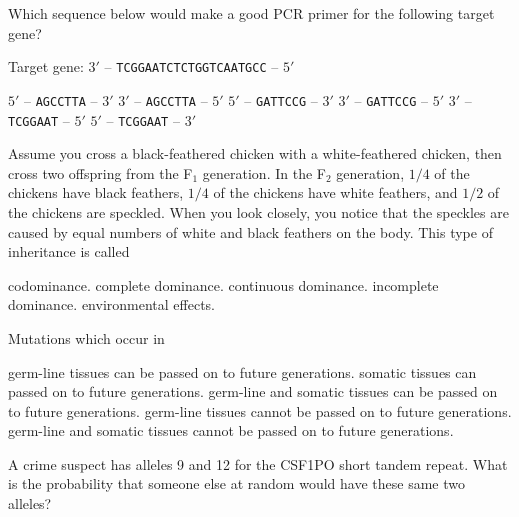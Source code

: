 \question
Which sequence below would make a good PCR primer for the following target gene?

\vspace{0.4\baselineskip}
Target gene: $3'$ -- \texttt{TCGGAATCTCTGGTCAATGCC} -- $5'$

\begin{choices}
\correctchoice $5'$ -- \texttt{AGCCTTA} -- $3'$%
\choice $3'$ -- \texttt{AGCCTTA} -- $5'$%
\choice $5'$ -- \texttt{GATTCCG} -- $3'$%
\choice $3'$ -- \texttt{GATTCCG} -- $5'$%
\choice $3'$ -- \texttt{TCGGAAT} -- $5'$%
\choice $5'$ -- \texttt{TCGGAAT} -- $3'$%
\end{choices}

\question
Assume you cross a black-feathered chicken with a white-feathered chicken, then cross two offspring from the F$_1$ generation.  In the F$_2$ generation, $1/4$ of the chickens have black feathers, $1/4$ of the chickens have white feathers, and $1/2$ of the chickens are speckled.  When you look closely, you notice that the speckles are caused by equal numbers of white and black feathers on the body. This type of inheritance is called

\begin{choices}
\correctchoice codominance.%
\choice complete dominance.%
\choice continuous dominance.%
\choice incomplete dominance.%
\choice environmental effects.%
\end{choices}

\question
Mutations which occur in 

\begin{choices}
\correctchoice germ-line tissues can be passed on to future generations.%
\choice somatic tissues can passed on to future generations.%
\choice germ-line  and somatic tissues can be passed on to future generations.%
\choice germ-line tissues cannot be passed on to future generations.%
\choice germ-line and somatic tissues cannot be passed on to future generations.%
\end{choices}

\question
A crime suspect has alleles 9 and 12 for the CSF1PO short tandem repeat. What is the probability that someone else at random would have these same two alleles?  

